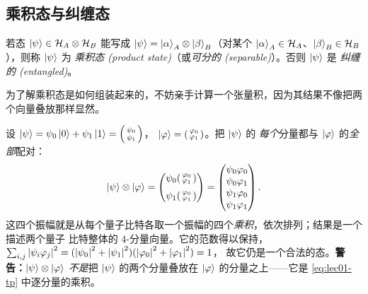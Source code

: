 \subsection{乘积态与纠缠态}
\label{sec:lec01-buildprod}

\begin{definition}[乘积态与纠缠态]\label{def:lec01-product}
若态 $\ket{\psi}\in\mathcal{H}_A\otimes\mathcal{H}_B$ 能写成
$\ket{\psi}=\ket{\alpha}_A\otimes\ket{\beta}_B$（对某个
$\ket{\alpha}_A\in\mathcal{H}_A$、$\ket{\beta}_B\in\mathcal{H}_B$），则称 $\ket{\psi}$ 为
\emph{乘积态 (product state)}（或\emph{可分的 (separable)}）。否则 $\ket{\psi}$ 是
\emph{纠缠的 (entangled)}。
\end{definition}

为了解乘积态是如何组装起来的，不妨亲手计算一个张量积，因为其结果不像把两个向量叠放那样显然。

\begin{example}\label{exa:lec01-tp-explicit}
设 $\ket{\psi}=\psi_0\ket0+\psi_1\ket1=\begin{psmallmatrix}\psi_0\\\psi_1\end{psmallmatrix}$，
$\ket{\varphi}=\begin{psmallmatrix}\varphi_0\\\varphi_1\end{psmallmatrix}$。把 $\ket{\psi}$ 的
\emph{每个}分量都与 $\ket{\varphi}$ 的\emph{全部}配对：
\begin{equation}\label{eq:lec01-tp}
  \ket{\psi}\otimes\ket{\varphi}
   =\begin{pmatrix}\psi_0\begin{psmallmatrix}\varphi_0\\\varphi_1\end{psmallmatrix}\\[6pt]
                   \psi_1\begin{psmallmatrix}\varphi_0\\\varphi_1\end{psmallmatrix}\end{pmatrix}
   =\begin{pmatrix}\psi_0\varphi_0\\ \psi_0\varphi_1\\ \psi_1\varphi_0\\ \psi_1\varphi_1\end{pmatrix}.
\end{equation}
这四个振幅就是从每个量子比特各取一个振幅的四个\emph{乘积}，依次排列；结果是一个描述两个量子
比特整体的 $4$-分量向量。它的范数得以保持，
$\sum_{i,j}\left\lvert \psi_i\varphi_j \right\rvert^{2}=(\left\lvert \psi_0 \right\rvert^2+\left\lvert \psi_1 \right\rvert^2)(\left\lvert \varphi_0 \right\rvert^2+\left\lvert \varphi_1 \right\rvert^2)=1$，
故它仍是一个合法的态。\textbf{警告：}$\ket{\psi}\otimes\ket{\varphi}$ \emph{不是}把 $\ket{\psi}$
的两个分量叠放在 $\ket{\varphi}$ 的分量之上——它是 \eqref{eq:lec01-tp} 中逐分量的乘积。
\end{example}

